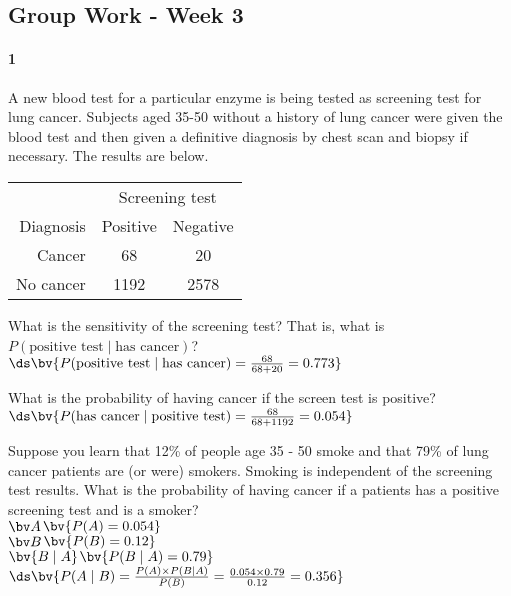 \documentclass{article}
\begin{document}
\begin{flushleft}
\section*{Group Work - Week 3}

\paragraph{1} A new blood test for a particular enzyme is being tested as screening test for lung cancer. Subjects aged 35-50 without a history of lung cancer were given the blood test and then given a definitive diagnosis by chest scan and biopsy if necessary. The results are below.\\ \medskip
{\centering
\begin{tabular}{ r| c c}
& \multicolumn{2}{c}{Screening test}\\
Diagnosis & Positive & Negative\\
\hline
 Cancer &  68  &  20  \\
 No cancer  & 1192   &  2578 \\
\end{tabular}
\par}


\begin{enumalpha}
\item What is the sensitivity of the screening test? That is, what is $P(\text{positive test} \mid \text{has cancer})$?\\
\medskip
$\ds \bv{P(\text{positive test} \mid \text{has cancer}) = \frac{68}{68+20} = 0.773}$
\vspace{.75in}

\item What is the probability of having cancer if the screen test is positive?\\
\medskip
$\ds \bv{P(\text{has cancer} \mid \text{positive test}) = \frac{68}{68+1192} = 0.054}$\\ \medskip
{}
\vspace{.75in}

\item Suppose you learn that 12\% of people age 35 - 50 smoke and that 79\% of lung cancer patients are (or were) smokers. Smoking is independent of the screening test results. What is the probability of having cancer if a patients has a positive screening test and is a smoker?\\
\medskip
$\bv A$$\bv{P(A) = 0.054}$\\
$\bv B$$\bv{P(B) = 0.12}$\\
$\bv{B \mid A}$$\bv{P(B \mid A) = 0.79}$\\ \medskip
$\ds \bv{P(A \mid B) = \frac{P(A) \times P(B \mid A)}{P(B)} = \frac{0.054 \times 0.79}{0.12} = 0.356}$
\end{enumalpha}


\end{flushleft}
\end{document}
